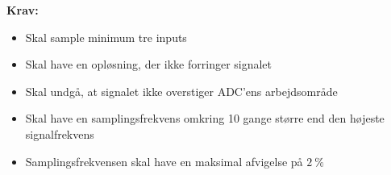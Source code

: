 \vspace{3mm}
\textbf{Krav:}
\begin{itemize}
\item Skal sample minimum tre inputs 
\item Skal have en opløsning, der ikke forringer signalet
\item Skal undgå, at signalet ikke overstiger ADC'ens arbejdsområde
\item Skal have en samplingsfrekvens omkring 10 gange større end den højeste signalfrekvens
\item Samplingsfrekvensen skal have en maksimal afvigelse på $2~\%$
\end{itemize}

